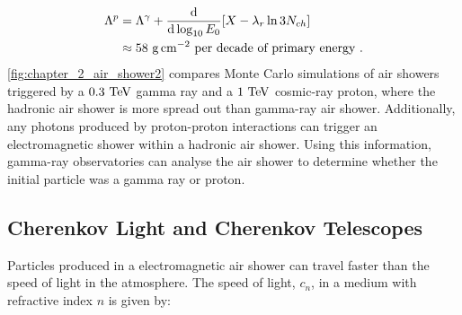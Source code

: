 \begin{equation}
    \begin{aligned}
    \Lambda^p &= \Lambda^\gamma + \dv{ }{\log_{10}E_0}\qty[X-\lambda_r\ln 3N_{ch}] \\
    &\approx 58~\si{\gram\per\centi\meter\squared}~\text{per decade of primary energy}\text{ .}
    \end{aligned}
\end{equation}
\noindent \autoref{fig:chapter_2_air_shower2} compares Monte Carlo simulations of air showers triggered by a $0.3~\TeV$ gamma ray and a $1~\TeV$ cosmic-ray proton, where the hadronic air shower is more spread out than gamma-ray air shower. Additionally, any photons produced by proton-proton interactions can trigger an electromagnetic shower within a hadronic air shower. Using this information, gamma-ray observatories can analyse the air shower to determine whether the initial particle was a gamma ray or proton.

\subsection{Cherenkov Light and Cherenkov Telescopes}

Particles produced in a electromagnetic air shower can travel faster than the speed of light in the atmosphere. The speed of light, $c_n$, in a medium with refractive index $n$ is given by:

